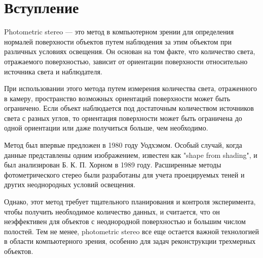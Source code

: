 \documentclass[12pt]{article}
\begin{document}


\newpage
\tableofcontents

\newpage

\section{Вступление}

Photometric stereo — это метод в компьютерном зрении для определения
нормалей поверхности объектов путем наблюдения за этим объектом
при различных условиях освещения. Он основан на том факте,
что количество света, отражаемого поверхностью, зависит от ориентации
поверхности относительно источника света и наблюдателя.

При использовании этого метода путем измерения количества света,
отраженного в камеру, пространство возможных ориентаций поверхности может
быть ограничено. Если объект наблюдается под достаточным количеством источников
света с разных углов, то ориентация поверхности может быть ограничена
до одной ориентации или даже получиться больше, чем необходимо.

Метод был впервые предложен в 1980 году Уодхэмом. Особый случай,
когда данные представлены одним изображением, известен как "shape from shading",
и был анализирован Б. К. П. Хорном в 1989 году. Расширенные методы фотометрического
стерео были разработаны для учета проецируемых теней и других
неоднородных условий освещения.

Однако, этот метод требует тщательного планирования и контроля эксперимента,
чтобы получить необходимое количество данных, и считается,
что он неэффективен для объектов с неоднородной поверхностью
и большим числом полостей. Тем не менее, photometric stereo все еще остается
важной технологией в области компьютерного зрения, особенно для задач
реконструкции трехмерных объектов.
\end{document}
